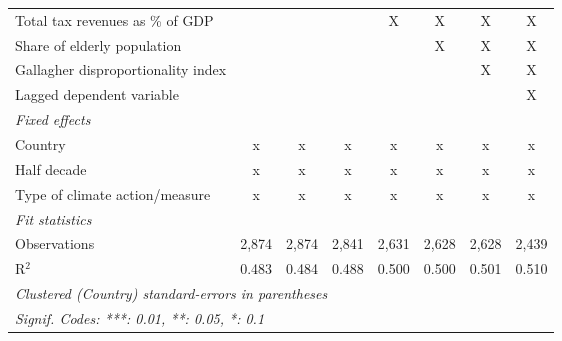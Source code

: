 \begin{table}[htbp]
\begin{tabular}{lccccccc}
      Total tax revenues as \% of GDP                                     &               &               &               & X             & X             & X             & X\\  
      Share of elderly population                                         &               &               &               &               & X             & X             & X\\  
      Gallagher disproportionality index                                  &               &               &               &               &               & X             & X\\  
      Lagged dependent variable                                           &               &               &               &               &               &               & X\\  
      \emph{Fixed effects}\\
      Country                                                             & x             & x             & x             & x             & x             & x             & x\\  
      Half decade                                                         & x             & x             & x             & x             & x             & x             & x\\  
      Type of climate action/measure                                      & x             & x             & x             & x             & x             & x             & x\\  
      \midrule \emph{Fit statistics}\\
      Observations                                                        & 2,874         & 2,874         & 2,841         & 2,631         & 2,628         & 2,628         & 2,439\\  
      R$^2$                                                               & 0.483         & 0.484         & 0.488         & 0.500         & 0.500         & 0.501         & 0.510\\  
      \midrule
      \multicolumn{8}{l}{\emph{Clustered (Country) standard-errors in parentheses}}\\
      \multicolumn{8}{l}{\emph{Signif. Codes: ***: 0.01, **: 0.05, *: 0.1}}\\
   \end{tabular}
\end{table}



